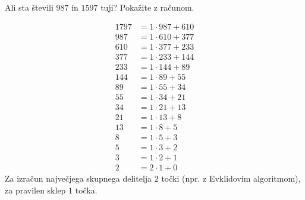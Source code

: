 \documentclass[addpoints,12pt]{exam}
\begin{document}
\begin{questions}




        \question[3]
        Ali sta števili $987$ in $1597$ tuji? Pokažite z računom.
        
        \begin{solution}[7cm]
            \begin{align*}
                1797&=1\cdot 987+610\\
                987&=1\cdot 610+377 \\
                610&=1\cdot 377+233 \\
                377&=1\cdot 233+144 \\
                233&=1\cdot 144+89 \\
                144&=1\cdot 89+55 \\
                89&=1\cdot 55+34 \\
                55&=1\cdot 34+21 \\
                34&=1\cdot 21+13 \\
                21&=1\cdot 13+8 \\
                13&=1\cdot 8+5 \\
                8&=1\cdot 5+3 \\
                5&=1\cdot 3+2 \\
                3&=1\cdot 2+1 \\
                2&=2\cdot 1+0
            \end{align*}
            Za izračun največjega skupnega delitelja $2$ točki (npr. z Evklidovim algoritmom), za pravilen sklep $1$ točka.
        \end{solution}
    


\end{questions}
\end{document}
